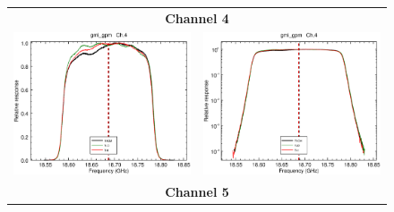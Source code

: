 \begin{figure}[H]
  \centering
  \begin{tabular}{c c}
    \multicolumn{2}{c}{\sffamily\textbf{Channel 4}}\\
    \includegraphics[scale=0.35]{graphics/lin/gmi_gpm-4.eps} &
    \includegraphics[scale=0.35]{graphics/log/gmi_gpm-4.eps} \\
    \multicolumn{2}{c}{\sffamily\textbf{Channel 5}}\\

\end{tabular}
\end{figure}

